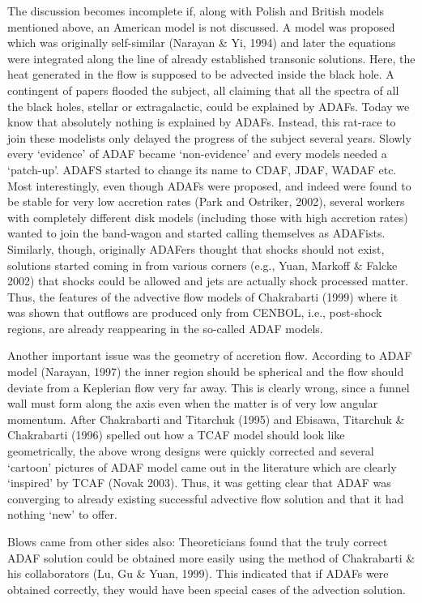 \documentclass{ws-procs975x65}
\begin{document}
The discussion becomes incomplete if, along with Polish and British models mentioned above, an American
model is not discussed. A model was proposed which was originally self-similar (Narayan \& Yi, 1994) and 
later the equations were integrated along the line of already established transonic solutions.
Here, the heat generated in the flow is supposed to be advected inside the black hole. 
A contingent of papers flooded the subject, all claiming that 
all the spectra of all the black holes, stellar or extragalactic, could be explained by ADAFs. Today
we know that absolutely nothing is explained by ADAFs. Instead, this rat-race to join these modelists
only delayed the progress of the subject several years. Slowly every `evidence' of ADAF 
became `non-evidence' and every models needed a `patch-up'. ADAFS started 
to change its name to CDAF, JDAF, WADAF etc. Most interestingly, even though ADAFs were proposed,
and indeed were found to be stable for very low accretion rates (Park and Ostriker, 2002), 
several workers with completely different disk models (including those with high accretion rates)
wanted to join the band-wagon and started calling themselves as ADAFists. Similarly, though, originally 
ADAFers thought that shocks should not exist, solutions started coming in from 
various corners (e.g., Yuan, Markoff \& Falcke 2002) that shocks could be allowed and jets are actually shock
processed matter. Thus, the features of the advective flow models of Chakrabarti (1999) 
where it was shown that outflows are produced only from CENBOL, i.e., post-shock regions, are 
already reappearing in the so-called ADAF models. 

Another important issue was the geometry of accretion flow. According 
to ADAF model (Narayan, 1997) the inner region should be spherical and 
the flow should deviate from a Keplerian flow very far away. This is 
clearly wrong, since a funnel wall must form along the axis even when
the matter is of very low angular momentum. After Chakrabarti and 
Titarchuk (1995) and Ebisawa, Titarchuk \& Chakrabarti (1996) spelled
out how a TCAF model should look like geometrically, the above wrong 
designs were quickly corrected and several `cartoon'  pictures of ADAF 
model came out in the literature which are clearly `inspired' by TCAF
(Novak 2003). Thus, it was getting clear that ADAF was converging to 
already existing successful advective flow solution and that it had
nothing `new' to offer.

Blows came from other sides also: Theoreticians found that the truly 
correct ADAF solution could be obtained more easily using the method 
of Chakrabarti \& his collaborators (Lu, Gu \& Yuan, 1999). This indicated 
that if ADAFs were obtained correctly, they would have been special cases 
of the advection solution.  
\end{document}
